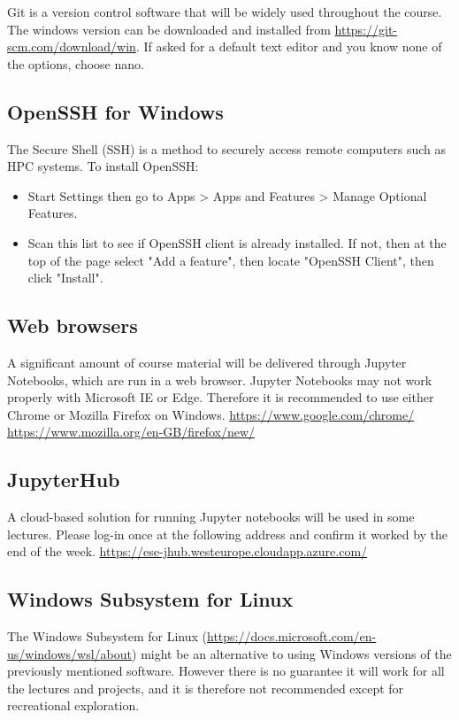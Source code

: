 \documentclass[11pt]{article}
\begin{document}
Git is a version control software that will be widely used throughout the course. 
The windows version can be downloaded and installed from \url{https://git-scm.com/download/win}. 
If asked for a default text editor and you know none of the options, choose nano.

\subsection{OpenSSH for Windows}

The Secure Shell (SSH) is a method to securely access remote computers such as HPC systems. To install OpenSSH:
\begin{itemize}
\item Start Settings then go to Apps > Apps and Features > Manage Optional Features.
\item Scan this list to see if OpenSSH client is already installed. If not, then at the top of the page select "Add a feature", then locate "OpenSSH Client", then click "Install".
\end{itemize}

\subsection{Web browsers}

A significant amount of course material will be delivered through Jupyter Notebooks, which are run in a web browser. 
Jupyter Notebooks may not work properly with Microsoft IE or Edge. 
Therefore it is recommended to use either Chrome or Mozilla Firefox on Windows.  
\url{https://www.google.com/chrome/}
\url{https://www.mozilla.org/en-GB/firefox/new/} 

\subsection{JupyterHub}

A cloud-based solution for running Jupyter notebooks will be used in some lectures. Please log-in once at the following address and confirm it worked by the end of the week.
\url{https://ese-jhub.westeurope.cloudapp.azure.com/}


\subsection{Windows Subsystem for Linux}

The Windows Subsystem for Linux (\url{https://docs.microsoft.com/en-us/windows/wsl/about}) might be an alternative to using Windows versions of the previously mentioned software. 
However there is no guarantee it will work for all the lectures and projects, and it is therefore not recommended except for recreational exploration.
\end{document}
